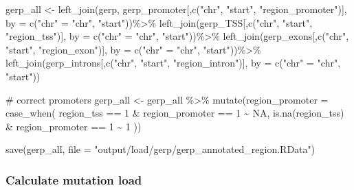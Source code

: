 \documentclass[
  letterpaper,
  DIV=11,
  numbers=noendperiod]{scrreprt}
\newenvironment{Shaded}{}{}
\newcommand{\AttributeTok}[1]{\textcolor[rgb]{0.84,0.23,0.29}{#1}}
\newcommand{\CommentTok}[1]{\textcolor[rgb]{0.42,0.45,0.49}{#1}}
\newcommand{\ConstantTok}[1]{\textcolor[rgb]{0.00,0.36,0.77}{#1}}
\newcommand{\DecValTok}[1]{\textcolor[rgb]{0.00,0.36,0.77}{#1}}
\newcommand{\FunctionTok}[1]{\textcolor[rgb]{0.44,0.26,0.76}{#1}}
\newcommand{\NormalTok}[1]{\textcolor[rgb]{0.14,0.16,0.18}{#1}}
\newcommand{\OtherTok}[1]{\textcolor[rgb]{0.44,0.26,0.76}{#1}}
\newcommand{\SpecialCharTok}[1]{\textcolor[rgb]{0.00,0.36,0.77}{#1}}
\newcommand{\StringTok}[1]{\textcolor[rgb]{0.01,0.18,0.38}{#1}}
\begin{document}
\begin{Shaded}
\begin{Highlighting}[]
\NormalTok{gerp\_all }\OtherTok{\textless{}{-}} \FunctionTok{left\_join}\NormalTok{(gerp, gerp\_promoter[,}\FunctionTok{c}\NormalTok{(}\StringTok{"chr"}\NormalTok{, }\StringTok{"start"}\NormalTok{, }\StringTok{"region\_promoter"}\NormalTok{)], }\AttributeTok{by =} \FunctionTok{c}\NormalTok{(}\StringTok{"chr"} \OtherTok{=} \StringTok{"chr"}\NormalTok{, }\StringTok{"start"}\NormalTok{))}\SpecialCharTok{\%\textgreater{}\%}
   \FunctionTok{left\_join}\NormalTok{(gerp\_TSS[,}\FunctionTok{c}\NormalTok{(}\StringTok{"chr"}\NormalTok{, }\StringTok{"start"}\NormalTok{, }\StringTok{"region\_tss"}\NormalTok{)], }\AttributeTok{by =} \FunctionTok{c}\NormalTok{(}\StringTok{"chr"} \OtherTok{=} \StringTok{"chr"}\NormalTok{, }\StringTok{"start"}\NormalTok{))}\SpecialCharTok{\%\textgreater{}\%}
  \FunctionTok{left\_join}\NormalTok{(gerp\_exons[,}\FunctionTok{c}\NormalTok{(}\StringTok{"chr"}\NormalTok{, }\StringTok{"start"}\NormalTok{, }\StringTok{"region\_exon"}\NormalTok{)], }\AttributeTok{by =} \FunctionTok{c}\NormalTok{(}\StringTok{"chr"} \OtherTok{=} \StringTok{"chr"}\NormalTok{, }\StringTok{"start"}\NormalTok{))}\SpecialCharTok{\%\textgreater{}\%}
  \FunctionTok{left\_join}\NormalTok{(gerp\_introns[,}\FunctionTok{c}\NormalTok{(}\StringTok{"chr"}\NormalTok{, }\StringTok{"start"}\NormalTok{, }\StringTok{"region\_intron"}\NormalTok{)], }\AttributeTok{by =} \FunctionTok{c}\NormalTok{(}\StringTok{"chr"} \OtherTok{=} \StringTok{"chr"}\NormalTok{, }\StringTok{"start"}\NormalTok{))}
 
\CommentTok{\# correct promoters}
\NormalTok{gerp\_all }\OtherTok{\textless{}{-}}\NormalTok{ gerp\_all }\SpecialCharTok{\%\textgreater{}\%} \FunctionTok{mutate}\NormalTok{(}\AttributeTok{region\_promoter =} \FunctionTok{case\_when}\NormalTok{(}
\NormalTok{  region\_tss }\SpecialCharTok{==} \DecValTok{1} \SpecialCharTok{\&}\NormalTok{ region\_promoter }\SpecialCharTok{==} \DecValTok{1} \SpecialCharTok{\textasciitilde{}} \ConstantTok{NA}\NormalTok{,}
  \FunctionTok{is.na}\NormalTok{(region\_tss) }\SpecialCharTok{\&}\NormalTok{ region\_promoter }\SpecialCharTok{==} \DecValTok{1} \SpecialCharTok{\textasciitilde{}} \DecValTok{1}
\NormalTok{))}

\FunctionTok{save}\NormalTok{(gerp\_all, }\AttributeTok{file =} \StringTok{"output/load/gerp/gerp\_annotated\_region.RData"}\NormalTok{)}
\end{Highlighting}
\end{Shaded}

\subsubsection{Calculate mutation load}\label{calculate-mutation-load}
\end{document}
